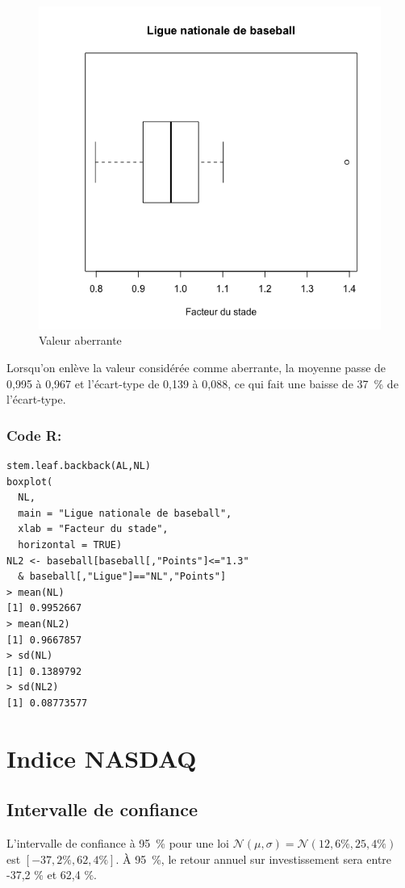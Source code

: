 \documentclass[10pt,twocolumn]{article}
\begin{document}
\begin{figure}[htbp]
	\caption{Valeur aberrante}
	\label{baseballBoxplot}
	\centering
	\includegraphics[width=\linewidth]{d1_baseballBoxplot}
\end{figure}

Lorsqu’on enlève la valeur considérée comme aberrante, la moyenne passe de 0,995 à 0,967 et l’écart-type de 0,139 à 0,088, ce qui fait une baisse de 37~\% de l’écart-type.

\subsubsection*{Code R:}
\begin{verbatim}
stem.leaf.backback(AL,NL)
boxplot(
  NL,
  main = "Ligue nationale de baseball",
  xlab = "Facteur du stade",
  horizontal = TRUE)
NL2 <- baseball[baseball[,"Points"]<="1.3"
  & baseball[,"Ligue"]=="NL","Points"]
> mean(NL)
[1] 0.9952667
> mean(NL2)
[1] 0.9667857
> sd(NL)
[1] 0.1389792
> sd(NL2)
[1] 0.08773577
\end{verbatim}



\section{Indice NASDAQ}

\subsection{Intervalle de confiance}
L’intervalle de confiance à 95~\% pour une loi $\mathcal{N}(\mu,\sigma) = \mathcal{N}(12,6 \%, 25,4\%)$ est $[-37,2 \%, 62,4 \%]$. À 95~\%, le retour annuel sur investissement sera entre -37,2 \% et 62,4 \%.
\end{document}

